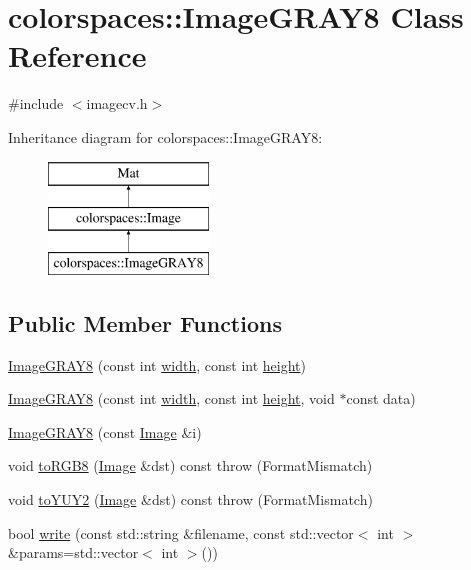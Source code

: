 \hypertarget{classcolorspaces_1_1_image_g_r_a_y8}{}\section{colorspaces\+:\+:Image\+G\+R\+A\+Y8 Class Reference}
\label{classcolorspaces_1_1_image_g_r_a_y8}


{\ttfamily \#include $<$imagecv.\+h$>$}

Inheritance diagram for colorspaces\+:\+:Image\+G\+R\+A\+Y8\+:\begin{figure}[H]
\begin{center}
\leavevmode
\includegraphics[height=3.000000cm]{classcolorspaces_1_1_image_g_r_a_y8}
\end{center}
\end{figure}
\subsection*{Public Member Functions}
\begin{DoxyCompactItemize}
\item 
\hyperlink{classcolorspaces_1_1_image_g_r_a_y8_ae476b3fb6e29b234541967ed1f5db65c}{Image\+G\+R\+A\+Y8} (const int \hyperlink{classcolorspaces_1_1_image_ab80af7d4797110c23ed575b329ec7c4f}{width}, const int \hyperlink{classcolorspaces_1_1_image_a99a05ebd37f61215b2c3042ecaefdbfc}{height})
\item 
\hyperlink{classcolorspaces_1_1_image_g_r_a_y8_a62a1649db441ffe382fa7f8cb4362524}{Image\+G\+R\+A\+Y8} (const int \hyperlink{classcolorspaces_1_1_image_ab80af7d4797110c23ed575b329ec7c4f}{width}, const int \hyperlink{classcolorspaces_1_1_image_a99a05ebd37f61215b2c3042ecaefdbfc}{height}, void $\ast$const data)
\item 
\hyperlink{classcolorspaces_1_1_image_g_r_a_y8_a8aad9c63c05c6d01020e09326514808f}{Image\+G\+R\+A\+Y8} (const \hyperlink{classcolorspaces_1_1_image}{Image} \&i)
\item 
void \hyperlink{classcolorspaces_1_1_image_g_r_a_y8_a8b88e7290adfaff67747a08fc4001d69}{to\+R\+G\+B8} (\hyperlink{classcolorspaces_1_1_image}{Image} \&dst) const  throw (\+Format\+Mismatch)
\item 
void \hyperlink{classcolorspaces_1_1_image_g_r_a_y8_a5970d76be3f354a79dd94f96fb7df2ff}{to\+Y\+U\+Y2} (\hyperlink{classcolorspaces_1_1_image}{Image} \&dst) const  throw (\+Format\+Mismatch)
\item 
bool \hyperlink{classcolorspaces_1_1_image_g_r_a_y8_a559cfcb61640fef0a6c5f3eedc521996}{write} (const std\+::string \&filename, const std\+::vector$<$ int $>$ \&params=std\+::vector$<$ int $>$())
\end{DoxyCompactItemize}
